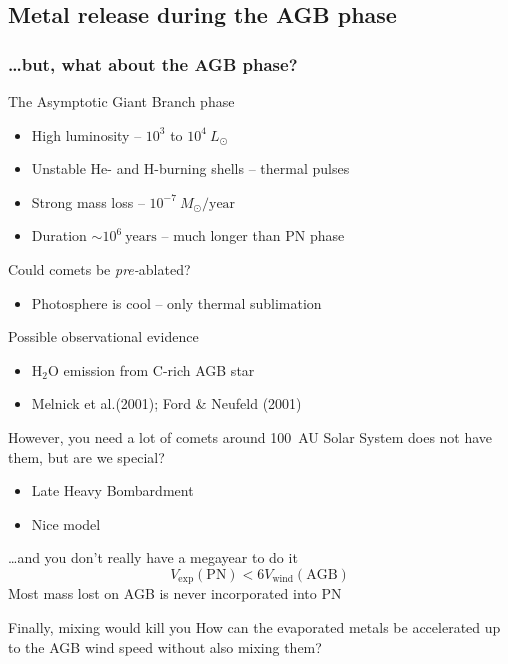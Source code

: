 \documentclass[presentation, compress]{beamer}
\begin{document}
\subsection{Metal release during the AGB phase}
\begin{frame}
  \frametitle{\dots but, what about the AGB phase?}
  \begin{overprint}
    \begin{block}{The Asymptotic Giant Branch phase}
      \begin{itemize}
      \item High luminosity -- \(10^3\) to \(10^4~L_\odot\)
      \item Unstable He- and H-burning shells -- thermal pulses
      \item Strong mass loss -- \(10^{-7}~M_\odot/\mathrm{year}\)
      \item Duration \(\sim 10^6~\mathrm{years}\) -- much longer than PN phase
      \end{itemize}
    \end{block}
    \begin{block}{Could comets be \emph{pre-}ablated?}
      \begin{itemize}
      \item Photosphere is cool -- only thermal sublimation
      \end{itemize}
    \end{block}
    \begin{block}{Possible observational evidence}
      \begin{itemize}
      \item H\(_\text{2}\)O emission from C-rich AGB star
      \item Melnick et al.\@ (2001); Ford \& Neufeld (2001)
      \end{itemize}
    \end{block}
    \begin{block}{However, you need a lot of comets around 100~AU}
      Solar System does not have them, but are we special?
      \begin{itemize}
      \item Late Heavy Bombardment
      \item Nice model
      \end{itemize}
    \end{block}
    \begin{block}{\dots and you don't really have a megayear to do it}
      \vspace*{-\baselineskip}
      \[V_{\mathrm{exp}}(\mathrm{PN}) < 6 V_{\mathrm{wind}}(\mathrm{AGB})\]
      Most mass lost on AGB is never incorporated into PN
    \end{block}
    \begin{block}{Finally, mixing would kill you}
      How can the evaporated metals be accelerated up to the AGB wind speed without also mixing them?
    \end{block}
  \end{overprint}
\end{frame}
\end{document}
